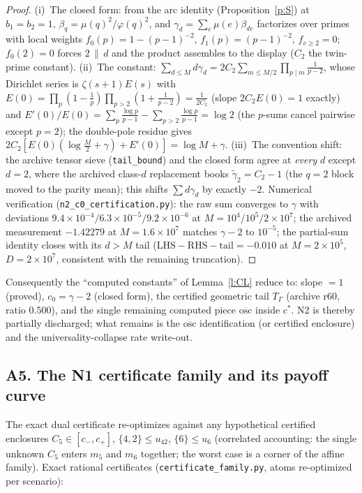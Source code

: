 \documentclass[11pt]{article}
\numberwithin{equation}{section}
\theoremstyle{definition}
\theoremstyle{remark}
\begin{document}
\begin{proof}
(i)~The closed form: from the arc identity
(Proposition~\ref{p:S}) at $b_1=b_2=1$,
$\beta_q=\mu(q)^2/\varphi(q)^2$, and
$\gamma_d=\sum_e\mu(e)\beta_{de}$ factorizes over primes with
local weights $f_0(p)=1-(p-1)^{-2}$, $f_1(p)=(p-1)^{-2}$,
$f_{v\ge2}=0$; $f_0(2)=0$ forces $2\,\|\,d$ and the product
assembles to the display ($C_2$ the twin-prime constant).
(ii)~The constant: $\sum_{d\le M}d\gamma_d
=2C_2\sum_{m\le M/2}\prod_{p\mid m}\tfrac1{p-2}$, whose Dirichlet
series is $\zeta(s+1)E(s)$ with
$E(0)=\prod_p(1-\tfrac1p)\prod_{p>2}(1+\tfrac1{p-2})
=\tfrac1{2C_2}$ (slope $2C_2E(0)=1$ exactly) and
$E'(0)/E(0)=\sum_p\tfrac{\log p}{p-1}
-\sum_{p>2}\tfrac{\log p}{p-1}=\log2$ (the $p$-sums cancel
pairwise except $p=2$); the double-pole residue gives
$2C_2[E(0)(\log\tfrac M2+\gamma)+E'(0)]=\log M+\gamma$.
(iii)~The convention shift: the archive tensor sieve
(\texttt{tail\_bound}) and the closed form agree at \emph{every}
$d$ except $d=2$, where the archived class-$d$ replacement books
$\widetilde\gamma_2=C_2-1$ (the $q=2$ block moved to the parity
mean); this shifts $\sum d\gamma_d$ by exactly $-2$. Numerical
verification (\texttt{n2\_c0\_certification.py}): the raw sum
converges to $\gamma$ with deviations
$9.4\times10^{-4}/6.3\times10^{-5}/9.2\times10^{-6}$ at
$M=10^4/10^5/2\times10^7$; the archived measurement $-1.42279$
at $M=1.6\times10^{7}$ matches $\gamma-2$ to $10^{-5}$; the
partial-sum identity closes with its $d>M$ tail
($\mathrm{LHS}-\mathrm{RHS}-\mathrm{tail}=-0.010$ at
$M=2\times10^5$, $D=2\times10^{7}$, consistent with the
remaining truncation).
\end{proof}

\noindent Consequently the ``computed constants'' of
Lemma~\ref{l:CL} reduce to: slope $=1$ (proved), $c_0=\gamma-2$
(closed form), the certified geometric tail $T_\Gamma$
(archive r60, ratio $0.500$), and the single remaining computed
piece $\overline{\mathrm{osc}}$ inside $c^{*}$. N2 is thereby
partially discharged; what remains is the
$\overline{\mathrm{osc}}$ identification (or certified
enclosure) and the universality-collapse rate write-out.

\subsection*{A5. The N1 certificate family and its payoff curve}

The exact dual certificate re-optimizes against any hypothetical
certified enclosures $C_5\in[c_-,c_+]$, $\{4,2\}\le u_{42}$,
$\{6\}\le u_{6}$ (correlated accounting: the single unknown
$C_5$ enters $m_5$ and $m_6$ together; the worst case is a
corner of the affine family). Exact rational certificates
(\texttt{certificate\_family.py}, atoms re-optimized per
scenario):
\end{document}
